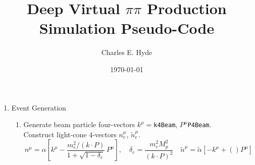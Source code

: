 \documentclass[12pt,amsmath,letter,notitlepage]{revtex4-1}
\begin{document}
\pagestyle{headings}

\title{Deep Virtual $\pi\pi$ Production Simulation Pseudo-Code}
\author{Charles E. Hyde}
\date{\today}
\maketitle

\begin{enumerate}
\item Event Generation
\begin{enumerate}
\item Generate beam particle four-vectors {$k^\mu=$\tt k4Beam}, {$P^\mu$\tt P4Beam}.\\
Construct light-cone 4-vectors $n_e^\mu$, $\widetilde n_e^\mu$.\\
\begin{equation}
n^\mu =\alpha\left[ k^\mu - \frac{m_e^2/(k\cdot P)}{1+ \sqrt{1-\delta_e}}\, P^\mu\right], 
\quad \delta_e = \frac{m_e^2 M_p^2}{(k\cdot P)^2}
\quad
\widetilde n^\mu = \widetilde\alpha\left[-k^\mu+()P^\mu\right]
\end{equation}


\end{enumerate}
\end{enumerate}
\end{document}
